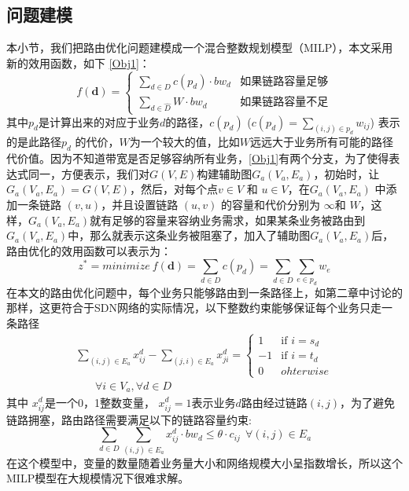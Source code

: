 \subsection{问题建模}
本小节，我们把路由优化问题建模成一个混合整数规划模型（MILP），本文采用新的效用函数，如下 \ref{Obj1}：
\begin{equation}\label{Obj1}
f(\mathbf{d})=\begin{cases}
\sum\limits_{d \in D} c(p_d) \cdot bw_{d} & \text{如果链路容量足够}\\
\sum\limits_{d \in \hat{D}} W \cdot bw_{d}& \text{如果链路容量不足}
\end{cases}
\end{equation}
其中$p_d$是计算出来的对应于业务$d$的路径，$c(p_d)$ ($c(p_d) = \sum_{(i,j)\in p_d} w_{ij}$) 表示的是此路径$p_d$ 的代价，$W$为一个较大的值，比如$W$远远大于业务所有可能的路径代价值。因为不知道带宽是否足够容纳所有业务，\ref{Obj1}有两个分支，为了使得表达式同一，方便表示，我们对$G(V, E)$构建辅助图$G_a(V_a, E_a)$，初始时，让$G_a(V_a, E_a) = G(V, E)$，然后，对每个点$v \in V$ 和 $u \in V$，在$G_a(V_a, E_a)$ 中添加一条链路 $(v, u)$，并且设置链路 $(u,v)$ 的容量和代价分别为 $\infty$和 $W$，这样，$G_a(V_a, E_a)$就有足够的容量来容纳业务需求，如果某条业务被路由到$G_a(V_a, E_a)$中，那么就表示这条业务被阻塞了，加入了辅助图$G_a(V_a, E_a)$后，路由优化的效用函数可以表示为：
\begin{equation}\label{Obj2}
z^* = minimize~f(\mathbf{d})=
\sum\limits_{d \in D} c(p_d)=  \sum\limits_{d \in D}\sum\limits_{e \in p_d} w_e
\end{equation}
在本文的路由优化问题中，每个业务只能够路由到一条路径上，如第二章中讨论的那样，这更符合于SDN网络的实际情况，以下整数约束能够保证每个业务只走一条路径
\begin{equation}\label{FlowConv}
\begin{split}
\sum\limits_{(i,j) \in E_a} x_{ij}^d - \sum\limits_{(j,i) \in E_a} x_{ji}^d
=\begin{cases}
1 & \text{if $i = s_d$}\\
-1 & \text{if $i = t_d$} \\
0 &{ohterwise}
\end{cases}
\\~~~~~~~~\forall i\in V_a, \forall d\in D
\end{split}
\end{equation}
其中 $x_{ij}^d$是一个0，1整数变量， $x_{ij}^d=1$表示业务$d$路由经过链路$(i,j)$，为了避免链路拥塞，路由路径需要满足以下的链路容量约束:
\begin{equation}\label{Capcon}
\sum\limits_{d \in D}\sum\limits_{(i,j) \in E_a} x_{ij}^d \cdot bw_d \le \theta\cdot c_{ij} ~~\forall (i,j)\in E_a
\end{equation}
在这个模型中，变量的数量随着业务量大小和网络规模大小呈指数增长，所以这个MILP模型在大规模情况下很难求解。
